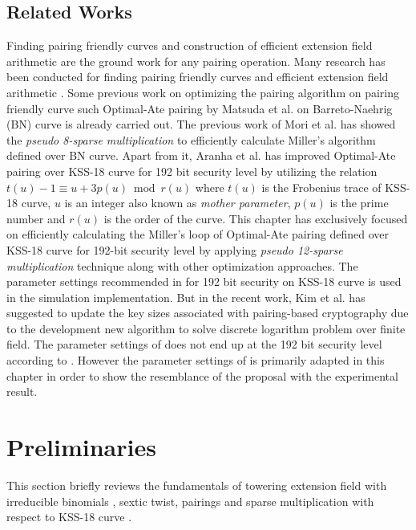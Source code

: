 \subsection{Related Works}
\label{sec:ch:icisc:related_works}
Finding pairing friendly curves \cite{EPRINT:FreScoTes06} and construction of efficient extension field arithmetic are the ground work for any pairing operation.
Many research  has been conducted for finding pairing friendly curves \cite{SCN:BarLynSco02, JC:DupEngMor05} and efficient extension field arithmetic \cite{JC:BaiPaa01}.
Some previous work on optimizing the pairing algorithm on pairing friendly curve such Optimal-Ate pairing by Matsuda et al. \cite{EPRINT:MKHO07} on Barreto-Naehrig (BN) curve \cite{SAC:BarNae05} is already carried out.
The previous work of Mori et al. \cite{PAIRING:MANS13} has showed the \textit{pseudo 8-sparse multiplication} to efficiently calculate Miller's algorithm defined over BN curve. Apart from it, Aranha et al. \cite{PAIRING:AFKMR12} has improved Optimal-Ate pairing over KSS-18 curve for 192 bit security level by utilizing the relation $t(u) - 1 \equiv u + 3p(u) \bmod r(u)$ where $t(u)$ is the Frobenius trace of KSS-18 curve, $u$ is an integer also known as \textit{mother parameter}, $p(u)$ is the prime number and $r(u)$ is the order of the curve. This chapter has exclusively focused on efficiently calculating the Miller's loop of Optimal-Ate pairing defined over KSS-18 curve \cite{EPRINT:KacSchSco07} for 192-bit security level by applying\textit{ pseudo 12-sparse multiplication} technique along with other optimization approaches. The parameter settings recommended in \cite{PAIRING:AFKMR12} for 192 bit security on KSS-18 curve is used in the simulation implementation. But in the recent work, Kim et al. \cite{C:KimBar16} has suggested to update the key sizes associated with pairing-based cryptography due to the development new algorithm to solve discrete logarithm problem over finite field. The parameter settings of \cite{PAIRING:AFKMR12} does not end up at the 192 bit security level according to \cite{C:KimBar16}. However the parameter settings of \cite{PAIRING:AFKMR12}  is primarily adapted in this chapter in order to show the resemblance of the proposal with the experimental result.

\section{Preliminaries}
\label{sec:ch:icisc:preliminaries}
This section briefly reviews the fundamentals of towering extension field with irreducible binomials \cite{JC:BaiPaa01}, sextic twist, pairings and sparse multiplication \cite{PAIRING:MANS13} with respect to KSS-18 curve \cite{EPRINT:KacSchSco07}.
